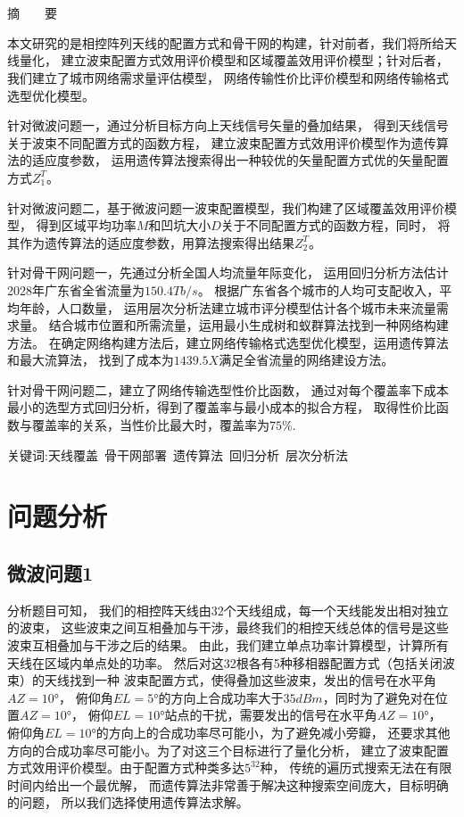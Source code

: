 \documentclass[UTF8,12pt]{ctexart}
\begin{document}
\section*{}%
\centerline{\textsf{摘\ \ \ \ 要}}
本文研究的是相控阵列天线的配置方式和骨干网的构建，针对前者，我们将所给天线量化，
建立波束配置方式效用评价模型和区域覆盖效用评价模型；针对后者，
我们建立了城市网络需求量评估模型，
网络传输性价比评价模型和网络传输格式选型优化模型。\par
针对微波问题一，通过分析目标方向上天线信号矢量的叠加结果，
得到天线信号关于波束不同配置方式的函数方程，
建立波束配置方式效用评价模型作为遗传算法的适应度参数，
运用遗传算法搜索得出一种较优的矢量配置方式优的矢量配置方式$Z_1^{T}$。\par
针对微波问题二，基于微波问题一波束配置模型，我们构建了区域覆盖效用评价模型，
得到区域平均功率$M$和凹坑大小$D$关于不同配置方式的函数方程，同时，
将其作为遗传算法的适应度参数，用算法搜索得出结果$Z_2^{T}$。\par
针对骨干网问题一，先通过分析全国人均流量年际变化，
运用回归分析方法估计2028年广东省全省流量为$150.4Tb/s$。
根据广东省各个城市的人均可支配收入，平均年龄，人口数量，
运用层次分析法建立城市评分模型估计各个城市未来流量需求量。
结合城市位置和所需流量，运用最小生成树和蚁群算法找到一种网络构建方法。
在确定网络构建方法后，建立网络传输格式选型优化模型，运用遗传算法和最大流算法，
找到了成本为$1439.5X$满足全省流量的网络建设方法。\par
针对骨干网问题二，建立了网络传输选型性价比函数，
通过对每个覆盖率下成本最小的选型方式回归分析，得到了覆盖率与最小成本的拟合方程，
取得性价比函数与覆盖率的关系，当性价比最大时，覆盖率为$75\%$.\par

\textsf{关键词:天线覆盖\ 骨干网部署\ 遗传算法\ 回归分析\ 层次分析法}
\newpage



\section{问题分析}
\subsection{微波问题1}分析题目可知，
我们的相控阵天线由32个天线组成，每一个天线能发出相对独立的波束，
这些波束之间互相叠加与干涉，最终我们的相控天线总体的信号是这些波束互相叠加与干涉之后的结果。
由此，我们建立单点功率计算模型，计算所有天线在区域内单点处的功率。
然后对这32根各有5种移相器配置方式（包括关闭波束）的天线找到一种
波束配置方式，使得叠加这些波束，发出的信号在水平角$AZ = 10°$，
俯仰角$EL= 5°$的方向上合成功率大于$35dBm$，同时为了避免对在位置$AZ=10°$，
俯仰$EL=10°$站点的干扰，需要发出的信号在水平角$AZ=10°$，
俯仰角$EL=10°$的方向上的合成功率尽可能小，为了避免减小旁瓣，
还要求其他方向的合成功率尽可能小。为了对这三个目标进行了量化分析，
建立了波束配置方式效用评价模型。由于配置方式种类多达$5^{32}$种，
传统的遍历式搜索无法在有限时间内给出一个最优解，
而遗传算法非常善于解决这种搜索空间庞大，目标明确的问题，
所以我们选择使用遗传算法求解。
\end{document}
